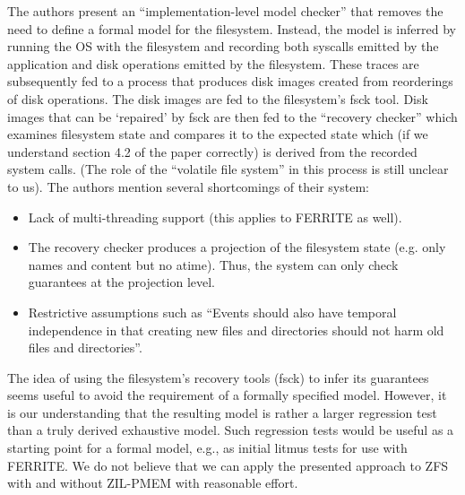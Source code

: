 \documentclass[12pt,a4paper,twoside]{book}
\begin{document}
The authors present an “implementation-level model checker” that removes the need to define a formal model for the filesystem.
Instead, the model is inferred by running the OS with the filesystem and recording both syscalls emitted by the application and disk operations emitted by the filesystem.
These traces are subsequently fed to a process that produces disk images created from reorderings of disk operations.
The disk images are fed to the filesystem’s fsck tool.
Disk images that can be ‘repaired’ by fsck are then fed to the “recovery checker” which examines filesystem state and compares it to the expected state which (if we understand section 4.2 of the paper correctly) is derived from the recorded system calls.
(The role of the “volatile file system” in this process is still unclear to us).
The authors mention several shortcomings of their system:
\begin{itemize}[noitemsep,beginpenalty=100000,midpenalty=100000]
    \item Lack of multi-threading support (this applies to FERRITE as well).
    \item The recovery checker produces a projection of the filesystem state (e.g. only names and content but no atime).
          Thus, the system can only check guarantees at the projection level.
    \item Restrictive assumptions such as “Events should also have temporal independence in that creating new files and directories should not harm old files and directories”.
\end{itemize}
The idea of using the filesystem’s recovery tools (fsck) to infer its guarantees seems useful to avoid the requirement of a formally specified model.
However, it is our understanding that the resulting model is rather a larger regression test than a truly derived exhaustive model.
Such regression tests would be useful as a starting point for a formal model, e.g., as initial litmus tests for use with FERRITE.
We do not believe that we can apply the presented approach to ZFS with and without ZIL-PMEM with reasonable effort.
\end{document}
